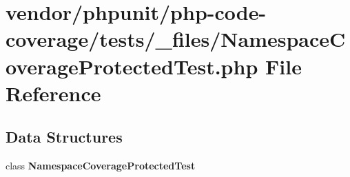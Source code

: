 \section{vendor/phpunit/php-\/code-\/coverage/tests/\+\_\+files/\+Namespace\+Coverage\+Protected\+Test.php File Reference}
\label{php-code-coverage_2tests_2__files_2_namespace_coverage_protected_test_8php}
\subsection*{Data Structures}
\begin{DoxyCompactItemize}
\item 
class {\bf Namespace\+Coverage\+Protected\+Test}
\end{DoxyCompactItemize}
